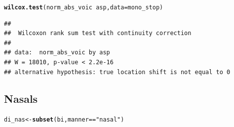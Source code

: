 \documentclass[a4paper,11pt]{article}\usepackage[]{graphicx}\usepackage[]{color}
\makeatletter
\newcommand{\hlstr}[1]{\textcolor[rgb]{0.192,0.494,0.8}{#1}}%
\newcommand{\hlopt}[1]{\textcolor[rgb]{0,0,0}{#1}}%
\newcommand{\hlstd}[1]{\textcolor[rgb]{0.345,0.345,0.345}{#1}}%
\newcommand{\hlkwb}[1]{\textcolor[rgb]{0.69,0.353,0.396}{#1}}%
\newcommand{\hlkwc}[1]{\textcolor[rgb]{0.333,0.667,0.333}{#1}}%
\newcommand{\hlkwd}[1]{\textcolor[rgb]{0.737,0.353,0.396}{\textbf{#1}}}%
\newenvironment{kframe}{%
 \def\at@end@of@kframe{}%
 \ifinner\ifhmode%
  \def\at@end@of@kframe{\end{minipage}}%
  \begin{minipage}{\columnwidth}%
 \fi\fi%
 \def\FrameCommand##1{\hskip\@totalleftmargin \hskip-\fboxsep
 \colorbox{shadecolor}{##1}\hskip-\fboxsep
     \hskip-\linewidth \hskip-\@totalleftmargin \hskip\columnwidth}%
 \MakeFramed {\advance\hsize-\width
   \@totalleftmargin\z@ \linewidth\hsize
   \@setminipage}}%
 {\par\unskip\endMakeFramed%
 \at@end@of@kframe}
\newenvironment{knitrout}{}{} %
\makeatother
\begin{document}
\begin{knitrout}
\color{fgcolor}\begin{kframe}
\begin{alltt}
\hlkwd{wilcox.test}\hlstd{(norm_abs_voic} \hlopt{~} \hlstd{asp,} \hlkwc{data} \hlstd{= mono_stop)}
\end{alltt}
\begin{verbatim}
## 
## 	Wilcoxon rank sum test with continuity correction
## 
## data:  norm_abs_voic by asp
## W = 18010, p-value < 2.2e-16
## alternative hypothesis: true location shift is not equal to 0
\end{verbatim}
\end{kframe}
\end{knitrout}

\subsection{Nasals}

\begin{knitrout}
\color{fgcolor}\begin{kframe}
\begin{alltt}
\hlstd{di_nas} \hlkwb{<-} \hlkwd{subset}\hlstd{(bi, manner} \hlopt{==} \hlstr{"nasal"}\hlstd{)}
\end{alltt}
\end{kframe}
\end{knitrout}
\end{document}
